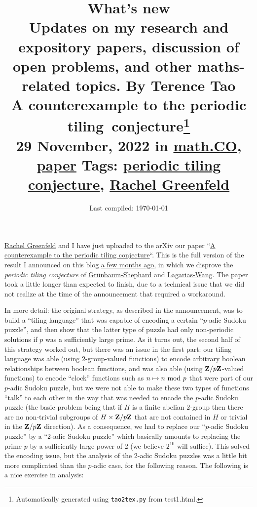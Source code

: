 \documentclass[11pt]{article}
\title{{\normalsize What's new\\Updates on my research and expository papers, discussion of open problems, and other maths-related topics.  By Terence Tao}\\A counterexample to the periodic tiling conjecture\footnote{Automatically generated using \texttt{tao2tex.py} from test1.html.}\\ \footnotesize 29 November, 2022 in \href{https://terrytao.wordpress.com/category/mathematics/mathco/}{math.CO}, \href{https://terrytao.wordpress.com/category/paper/}{paper} \textbar Tags: \href{https://terrytao.wordpress.com/tag/periodic-tiling-conjecture/}{periodic tiling conjecture}, \href{https://terrytao.wordpress.com/tag/rachel-greenfeld/}{Rachel Greenfeld} }
\author{}
\date{Last compiled: \today}
\theoremstyle{definition}
\theoremstyle{remark}
\begin{document}
\maketitle

\href{https://www.ias.edu/scholars/rachel-greenfeld}{Rachel Greenfeld} and I have just uploaded to the arXiv our paper “\href{https://arxiv.org/abs/2211.15847}{A counterexample to the periodic tiling conjecture}“. This is the full version of the result I announced on this blog \href{https://terrytao.wordpress.com/2022/09/19/a-counterexample-to-the-periodic-tiling-conjecture/}{a few months ago}, in which we disprove the \emph{periodic tiling conjecture} of \href{https://mathscinet.ams.org/mathscinet-getitem?mr=857454}{Grünbaum-Shephard} and \href{https://mathscinet.ams.org/mathscinet-getitem?mr=1369421}{Lagarias-Wang}. The paper took a little longer than expected to finish, due to a technical issue that we did not realize at the time of the announcement that required a workaround. 

In more detail: the original strategy, as described in the announcement, was to build a “tiling language” that was capable of encoding a certain “\({p}\)-adic Sudoku puzzle”, and then show that the latter type of puzzle had only non-periodic solutions if \({p}\) was a sufficiently large prime. As it turns out, the second half of this strategy worked out, but there was an issue in the first part: our tiling language was able (using \({2}\)-group-valued functions) to encode arbitrary boolean relationships between boolean functions, and was also able (using \({{\bf Z}/p{\bf Z}}\)-valued functions) to encode “clock” functions such as \({n \mapsto n \hbox{ mod } p}\) that were part of our \({p}\)-adic Sudoku puzzle, but we were not able to make these two types of functions “talk” to each other in the way that was needed to encode the \({p}\)-adic Sudoku puzzle (the basic problem being that if \({H}\) is a finite abelian \({2}\)-group then there are no non-trivial subgroups of \({H \times {\bf Z}/p{\bf Z}}\) that are not contained in \({H}\) or trivial in the \({{\bf Z}/p{\bf Z}}\) direction). As a consequence, we had to replace our “\({p}\)-adic Sudoku puzzle” by a “\({2}\)-adic Sudoku puzzle” which basically amounts to replacing the prime \({p}\) by a sufficiently large power of \({2}\) (we believe \({2^{10}}\) will suffice). This solved the encoding issue, but the analysis of the \({2}\)-adic Sudoku puzzles was a little bit more complicated than the \({p}\)-adic case, for the following reason. The following is a nice exercise in analysis:
\end{document}
